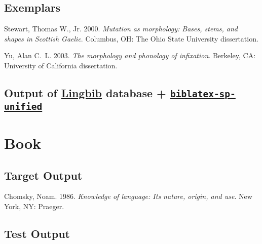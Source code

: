 \documentclass{article}
\newcommand*{\Lingbib}{\href{http://lingbib.org/}{Lingbib}}
\newcommand*{\SPUnified}{\href{https://github.com/semprag/biblatex-sp-unified/}{\Package{biblatex-sp-unified}}}
\newcommand*{\Package}[1]{\texttt{#1}}
\begin{document}
\subsection{Exemplars}

\begin{hangparas}{15pt}{1}

Stewart, Thomas W., Jr. 2000. \textit{Mutation as morphology: Bases, stems, and shapes in Scottish Gaelic}. Columbus, OH: The Ohio State University dissertation.

Yu, Alan C.~L. 2003. \textit{The morphology and phonology of infixation}. Berkeley, CA: University of California dissertation.

\end{hangparas}

\subsection{Output of \Lingbib{} database + \SPUnified}

\nocite{munn1993:coordinate}

\printbibliography[
	heading=none
]



\section{Book}

\subsection{Target Output}

\begin{hangparas}{15pt}{1}
	
Chomsky, Noam. 1986. \textit{Knowledge of language: Its nature, origin, and use}. New York, NY: Praeger.

\end{hangparas}

\subsection{Test Output}

\nocite{chomsky1986:knowledge}

\printbibliography[
heading=none
]
\end{document}
